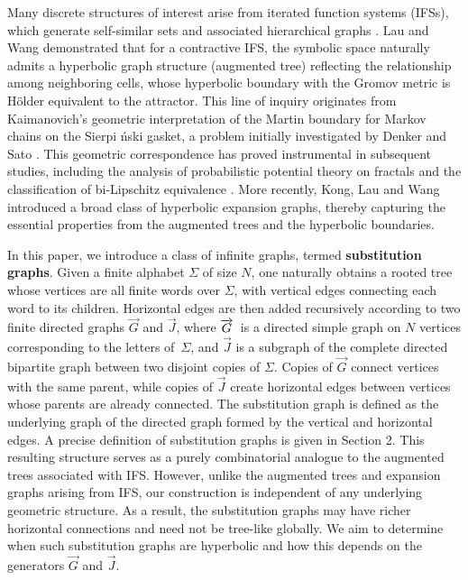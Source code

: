 \documentclass[reqno]{amsart}
\theoremstyle{plain}
\numberwithin{equation}{section}
\begin{document}
Many discrete structures of interest arise from iterated function systems
(IFSs), which generate self-similar sets \cite{Hutchinson,Falconer} and
associated hierarchical graphs \cite{Bao}. Lau and Wang \cite%
{Lau2009,Lau2017} demonstrated that for a contractive IFS, the symbolic
space naturally admits a hyperbolic graph structure (augmented tree)
reflecting the relationship among neighboring cells, whose hyperbolic
boundary with the Gromov metric is H\"{o}lder equivalent to the attractor.
This line of inquiry originates from Kaimanovich's geometric interpretation 
\cite{Kaimanovich} of the Martin boundary for Markov chains on the Sierpi%
\'{n}ski gasket, a problem initially investigated by Denker and Sato \cite%
{Denker}. This geometric correspondence has proved instrumental in
subsequent studies, including the analysis of probabilistic potential theory
on fractals \cite{Kong2017,Kong-arXiv} and the classification of
bi-Lipschitz equivalence \cite{Luo}. More recently, Kong, Lau and Wang \cite%
{Kong2021} introduced a broad class of hyperbolic expansion graphs, thereby
capturing the essential properties from the augmented trees and the
hyperbolic boundaries.

In this paper, we introduce a class of infinite graphs, termed \textbf{%
substitution graphs}. Given a finite alphabet $\Sigma $ of size $N$, one
naturally obtains a rooted tree whose vertices are all finite words over $%
\Sigma $, with vertical edges connecting each word to its children.
Horizontal edges are then added recursively according to two finite directed
graphs $\overrightarrow{G}$ and $\overrightarrow{J}$, where $\overrightarrow{%
G}$\ is a directed simple graph on $N$ vertices corresponding to the letters
of\ $\Sigma $, and $\overrightarrow{J}$ is a subgraph of the complete
directed bipartite graph between two disjoint copies of $\Sigma $. Copies of 
$\overrightarrow{G}$ connect vertices with the same parent, while copies of $%
\overrightarrow{J}$ create horizontal edges between vertices whose parents
are already connected. The substitution graph is defined as the underlying
graph of the directed graph formed by the vertical and horizontal edges. A
precise definition of substitution graphs is given in Section 2. This
resulting structure serves as a purely combinatorial analogue to the
augmented trees associated with IFS. However, unlike the augmented trees and
expansion graphs arising from IFS, our construction is independent of any
underlying geometric structure. As a result, the substitution graphs may
have richer horizontal connections and need not be tree-like globally. We
aim to determine when such substitution graphs are hyperbolic and how this
depends on the generators $\overrightarrow{G}$ and $\overrightarrow{J}$.
\end{document}
